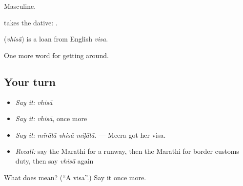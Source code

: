 Masculine.

  takes the dative:   .

\begin{cousinweb}
\textbf{} (\emph{vhisā}) is a loan from English \emph{visa}.
\end{cousinweb}

\begin{grammarlens}[title={What you've built}]
One more word for getting around.
\end{grammarlens}

\subsection*{Your turn}
\begin{itemize}
\raggedright
  \item \emph{Say it:} \emph{vhisā}
  \item \emph{Say it:} \emph{vhisā}, once more
  \item \emph{Say it:} \emph{mīrālā vhisā miḷālā.} — Meera got her visa.
  \item \emph{Recall:} say the Marathi for a runway, then the Marathi for border customs duty, then say \emph{vhisā} again
\end{itemize}

\begin{tcolorbox}[breakable,colback=teal!4,colframe=teal!35!black,title={Before you move on}]
What does  mean? (\textquotedblleft{}A visa\textquotedblright{}.) Say it once more.
\end{tcolorbox}
